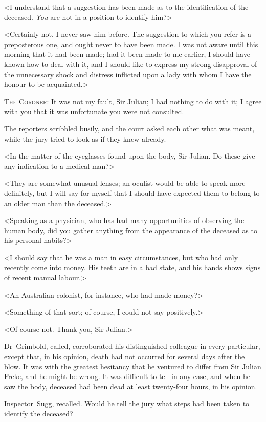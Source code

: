 <I understand that a suggestion has been made as to the identification of the deceased. \textit{You} are not in a position to identify him?>

<Certainly not. I never saw him before. The suggestion to which you refer is a preposterous one, and ought never to have been made. I was not aware until this morning that it had been made; had it been made to me earlier, I should have known how to deal with it, and I should like to express my strong disapproval of the unnecessary shock and distress inflicted upon a lady with whom I have the honour to be acquainted.>

\textsc{The Coroner}: It was not my fault, Sir Julian; I had nothing to do with it; I agree with you that it was unfortunate you were not consulted.

The reporters scribbled busily, and the court asked each other what was meant, while the jury tried to look as if they knew already.

<In the matter of the eyeglasses found upon the body, Sir Julian. Do these give any indication to a medical man?>

<They are somewhat unusual lenses; an oculist would be able to speak more definitely, but I will say for myself that I should have expected them to belong to an older man than the deceased.>

<Speaking as a physician, who has had many opportunities of observing the human body, did you gather anything from the appearance of the deceased as to his personal habits?>

<I should say that he was a man in easy circumstances, but who had only recently come into money. His teeth are in a bad state, and his hands shows signs of recent manual labour.>

<An Australian colonist, for instance, who had made money?>

<Something of that sort; of course, I could not say positively.>

<Of course not. Thank you, Sir Julian.>

Dr~Grimbold, called, corroborated his distinguished colleague in every particular, except that, in his opinion, death had not occurred for several days after the blow. It was with the greatest hesitancy that he ventured to differ from Sir Julian Freke, and he might be wrong. It was difficult to tell in any case, and when he saw the body, deceased had been dead at least twenty-four hours, in his opinion.

Inspector~Sugg, recalled. Would he tell the jury what steps had been taken to identify the deceased?


